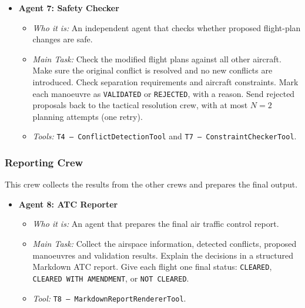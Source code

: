 \begin{itemize}[leftmargin=*]

    \item \textbf{Agent 7: Safety Checker}
    \begin{itemize}
        \item \textit{Who it is:} An independent agent that checks whether proposed flight-plan changes are safe.
        \item \textit{Main Task:} Check the modified flight plans against all other aircraft. Make sure the original conflict is resolved and no new conflicts are introduced. Check separation requirements and aircraft constraints. Mark each manoeuvre as \texttt{VALIDATED} or \texttt{REJECTED}, with a reason. Send rejected proposals back to the tactical resolution crew, with at most $N = 2$ planning attempts (one retry).
        \item \textit{Tools:} \texttt{T4 -- ConflictDetectionTool} and \texttt{T7 -- ConstraintCheckerTool}.
    \end{itemize}

\end{itemize}


\subsubsection{Reporting Crew}

This crew collects the results from the other crews and prepares the final output.

\begin{itemize}[leftmargin=*]

    \item \textbf{Agent 8: ATC Reporter}
    \begin{itemize}
        \item \textit{Who it is:} An agent that prepares the final air traffic control report.
        \item \textit{Main Task:} Collect the airspace information, detected conflicts, proposed manoeuvres and validation results. Explain the decisions in a structured Markdown ATC report. Give each flight one final status: \texttt{CLEARED}, \texttt{CLEARED WITH AMENDMENT}, or \texttt{NOT CLEARED}.
        \item \textit{Tool:} \texttt{T8 -- MarkdownReportRendererTool}.
    \end{itemize}

\end{itemize}



